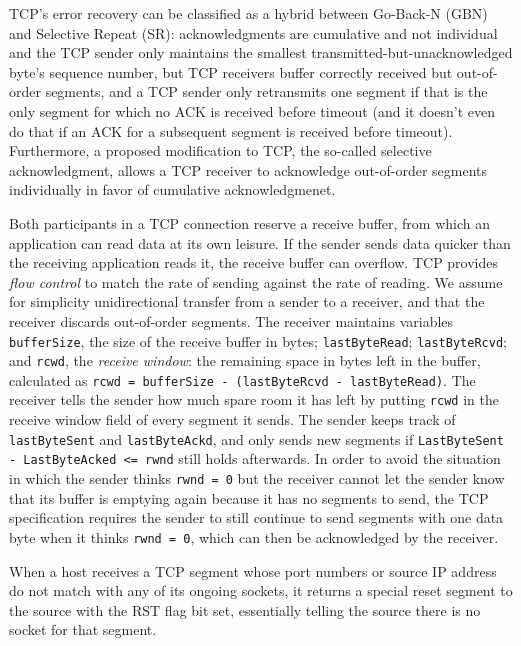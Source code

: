 \documentclass[8pt, table, xcdraw]{article}%
\begin{document}
TCP's error recovery can be classified as a hybrid between Go-Back-N (GBN) and Selective Repeat (SR): acknowledgments are cumulative and not individual and the TCP sender only maintains the smallest transmitted-but-unacknowledged byte's sequence number, but TCP receivers buffer correctly received but out-of-order segments, and a TCP sender only retransmits one segment if that is the only segment for which no ACK is received before timeout (and it doesn't even do that if an ACK for a subsequent segment is received before timeout). Furthermore, a proposed modification to TCP, the so-called selective acknowledgment, allows a TCP receiver to acknowledge out-of-order segments individually in favor of cumulative acknowledgmenet.

Both participants in a TCP connection reserve a receive buffer, from which an application can read data at its own leisure. If the sender sends data quicker than the receiving application reads it, the receive buffer can overflow. TCP provides \emph{flow control} to match the rate of sending against the rate of reading. We assume for simplicity unidirectional transfer from a sender to a receiver, and that the receiver discards out-of-order segments. The receiver maintains variables \lstinline{bufferSize}, the size of the receive buffer in bytes; \lstinline{lastByteRead}; \lstinline{lastByteRcvd}; and \lstinline{rcwd}, the \emph{receive window}: the remaining space in bytes left in the buffer, calculated as \lstinline{rcwd = bufferSize - (lastByteRcvd - lastByteRead)}. The receiver tells the sender how much spare room it has left by putting \lstinline{rcwd} in the receive window field of every segment it sends. The sender keeps track of \lstinline{lastByteSent} and \lstinline{lastByteAckd}, and only sends new segments if \lstinline{LastByteSent - LastByteAcked <= rwnd} still holds afterwards. In order to avoid the situation in which the sender thinks \lstinline{rwnd = 0} but the receiver cannot let the sender know that its buffer is emptying again because it has no segments to send, the TCP specification requires the sender to still continue to send segments with one data byte when it thinks \lstinline{rwnd = 0}, which can then be acknowledged by the receiver.

When a host receives a TCP segment whose port numbers or source IP address do not match with any of its ongoing sockets, it returns a special reset segment to the source with the RST flag bit set, essentially telling the source there is no socket for that segment.
\end{document}
